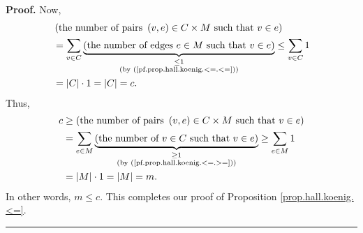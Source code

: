 \documentclass[numbers=enddot,12pt,final,onecolumn,notitlepage]{scrartcl}%
\theoremstyle{definition}
\newenvironment{proof}[1][Proof]{\noindent\textbf{#1.} }{\ \rule{0.5em}{0.5em}}
\let\sumnonlimits\sum
\renewcommand{\sum}{\sumnonlimits\limits}
\begin{document}
\begin{proof}
Now,
\begin{align*}
&  \left(  \text{the number of pairs }\left(  v,e\right)  \in C\times M\text{
such that }v\in e\right) \\
&  =\sum_{v\in C}\underbrace{\left(  \text{the number of edges }e\in M\text{
such that }v\in e\right)  }_{\substack{\leq1\\\text{(by
(\ref{pf.prop.hall.koenig.<=.<=}))}}}\leq\sum_{v\in C}1\\
&  =\left\vert C\right\vert \cdot1=\left\vert C\right\vert =c.
\end{align*}
Thus,%
\begin{align*}
c  &  \geq\left(  \text{the number of pairs }\left(  v,e\right)  \in C\times
M\text{ such that }v\in e\right) \\
&  =\sum_{e\in M}\underbrace{\left(  \text{the number of }v\in C\text{ such
that }v\in e\right)  }_{\substack{\geq1\\\text{(by
(\ref{pf.prop.hall.koenig.<=.>=}))}}}\geq\sum_{e\in M}1\\
&  =\left\vert M\right\vert \cdot1=\left\vert M\right\vert =m.
\end{align*}
In other words, $m\leq c$. This completes our proof of Proposition
\ref{prop.hall.koenig.<=}.
\end{proof}
\end{document}
